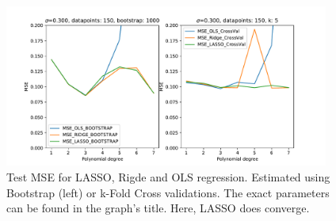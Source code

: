 \documentclass[11pt,a4paper,titlepage]{article}
\begin{document}
\begin{figure}[H]
\centering
\includegraphics[width=0.95\textwidth]{MSE_different_methods_Franke_small.pdf}
\caption[Test MSE for LASSO, Rigde and OLS regression]{Test MSE for LASSO, Rigde and OLS regression. Estimated using Bootstrap (left) or k-Fold Cross validations. The exact parameters can be found in the graph's title. Here, LASSO does converge.}
\label{fig:ConvergingLasso_Franke}
\end{figure}
\end{document}

